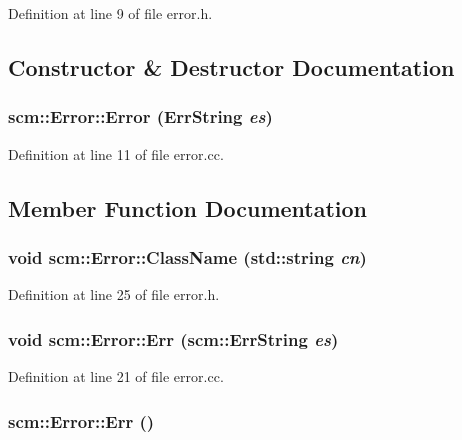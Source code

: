 Definition at line 9 of file error.h.



\subsection{Constructor \& Destructor Documentation}
\hypertarget{classscm_1_1_error_a9c6aa255ce180155a748f304f83830d3}{
\subsubsection[{Error}]{\setlength{\rightskip}{0pt plus 5cm}scm::Error::Error ({\bf ErrString} {\em es})}}
\label{classscm_1_1_error_a9c6aa255ce180155a748f304f83830d3}


Definition at line 11 of file error.cc.



\subsection{Member Function Documentation}
\hypertarget{classscm_1_1_error_a3d3598611ee2955f3144ec2602b69677}{
\subsubsection[{ClassName}]{\setlength{\rightskip}{0pt plus 5cm}void scm::Error::ClassName (std::string {\em cn})}}
\label{classscm_1_1_error_a3d3598611ee2955f3144ec2602b69677}


Definition at line 25 of file error.h.

\hypertarget{classscm_1_1_error_aa4309b2556e84bd9bc6c7871f3be2f7a}{
\subsubsection[{Err}]{\setlength{\rightskip}{0pt plus 5cm}void scm::Error::Err ({\bf scm::ErrString} {\em es})}}
\label{classscm_1_1_error_aa4309b2556e84bd9bc6c7871f3be2f7a}


Definition at line 21 of file error.cc.

\hypertarget{classscm_1_1_error_a8fa002269b2ea7b0af4581951a7908f0}{
\subsubsection[{Err}]{ scm::Error::Err ()}}
\label{classscm_1_1_error_a8fa002269b2ea7b0af4581951a7908f0}


